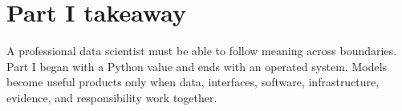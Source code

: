 \section{Part I takeaway}

A professional data scientist must be able to follow meaning across boundaries.
Part I began with a Python value and ends with an operated system. Models become
useful products only when data, interfaces, software, infrastructure, evidence,
and responsibility work together.
